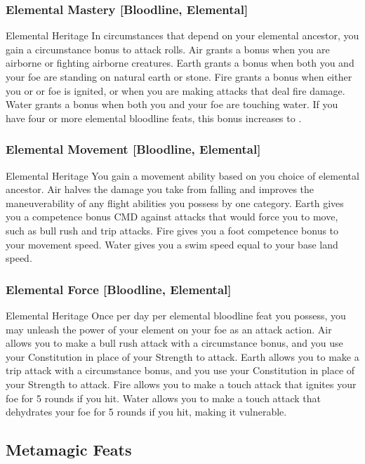 \subsubsection{Elemental Mastery [Bloodline, Elemental]}
\featpre Elemental Heritage
\featben In circumstances that depend on your elemental ancestor, you gain a  circumstance bonus to attack rolls. Air grants a bonus when you are airborne or fighting airborne creatures. Earth grants a bonus when both you and your foe are standing on natural earth or stone. Fire grants a bonus when either you or or foe is ignited, or when you are making attacks that deal fire damage. Water grants a bonus when both you and your foe are touching water. If you have four or more elemental bloodline feats, this bonus increases to .

\subsubsection{Elemental Movement [Bloodline, Elemental]}
\featpre Elemental Heritage
\featben You gain a movement ability based on you choice of elemental ancestor. Air halves the damage you take from falling and improves the maneuverability of any flight abilities you possess by one category. Earth gives you a  competence bonus CMD against attacks that would force you to move, such as bull rush and trip attacks. Fire gives you a  foot competence bonus to your movement speed. Water gives you a swim speed equal to your base land speed.

\subsubsection{Elemental Force [Bloodline, Elemental]}
\featpre Elemental Heritage
\featben Once per day per elemental bloodline feat you possess, you may unleash the power of your element on your foe as an attack action. Air allows you to make a bull rush attack with a  circumstance bonus, and you use your Constitution in place of your Strength to attack. Earth allows you to make a trip attack with a  circumstance bonus, and you use your Constitution in place of your Strength to attack. Fire allows you to make a touch attack that ignites your foe for 5 rounds if you hit. Water allows you to make a touch attack that dehydrates your foe for 5 rounds if you hit, making it vulnerable.

\subsection{Metamagic Feats}

